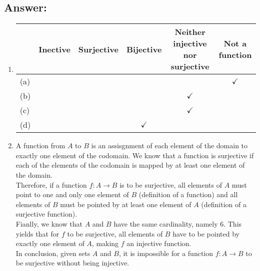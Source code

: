 \subsection{Answer:}

\begin{enumerate}
    \item[]
\begin{center}
\begin{tabular}{|l|c|c|c|c|c|}
\hline
		& Inective		& Surjective	& Bijective 	& \multicolumn{1}{m{3cm}|}{Neither injective nor surjective}	&	Not a function	\\
\hline
(a)		& 		& 		& 	& 			&$\checkmark$  \\
\hline

(b)		& 		& 		& 		& $\checkmark$	&	 \\
\hline


(c)		& 		& 		& 	& $\checkmark$	&  \\
\hline

(d)		& 		& 		&$\checkmark$ 		&	&  \\
\hline
\end{tabular}
\end{center}

	\item A function from $A$ to $B$ is an assisgnment of each element of the domain to exactly one element of the codomain.
	We know that a function is surjective if each of the elements of the codomain is mapped by at least one element of the domain.
	\\
	Therefore, if a function $f : A \rightarrow B$ is to be surjective, all elements of $A$ must point to one and only one 
	element of $B$ (definition of a function) and all elements of $B$ must be pointed by at least one element of $A$ (definition
	of a surjective function).
	\\
	Fianlly, we know that $A$ and $B$ have the same cardinality, namely 6. This yields that for $f$ to be surjective, all elements
	of $B$ have to be pointed by exactly one element of $A$, making $f$ an injective function. 
	\\
	In conclusion, given sets $A$ and $B$, it is impossible for a function $f : A \rightarrow B$ to be surjective without
	being injective.  
\end{enumerate}
